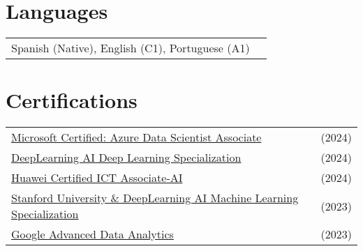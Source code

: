 \documentclass[a4paper,10pt]{article}
\begin{document}
\section{Languages}
\begin{tabularx}{\linewidth}{@{}l X@{}}
Spanish (Native), English (C1), Portuguese (A1)\\  
\end{tabularx}

\section{Certifications}
\begin{tabularx}{\linewidth}{@{}l X@{}}	
\href{https://balcortex.github.io/assets/certifications/microsoft_azure_data_scientist_associate.pdf}{Microsoft Certified: Azure Data Scientist Associate} & \hfill (2024) \\
\href{https://balcortex.github.io/assets/certifications/coursera_deep_learning.pdf}{DeepLearning AI Deep Learning Specialization} & \hfill (2024) \\
\href{https://balcortex.github.io/assets/certifications/huawei_certification.pdf}{Huawei Certified ICT Associate-AI} & \hfill (2024) \\
\href{https://balcortex.github.io/assets/certifications/coursera_machine_learning.pdf}{Stanford University \& DeepLearning AI Machine Learning Specialization} & \hfill (2023) \\
\href{https://balcortex.github.io/assets/certifications/coursera_google_advanced_data_analytics.pdf}{Google Advanced Data Analytics} & \hfill (2023) \\
\end{tabularx}

\end{document}
